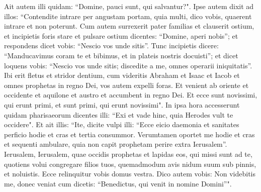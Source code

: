 \begin{biblechapter}
\verse Ait autem illi quidam: “Domine, pauci sunt, qui salvantur?". Ipse autem dixit ad illos: 
\verse “Contendite intrare per angustam portam, quia multi, dico vobis, quaerent intrare et non poterunt. 
\verse Cum autem surrexerit pater familias et clauserit ostium, et incipietis foris stare et pulsare ostium dicentes: “Domine, aperi nobis”; et respondens dicet vobis: “Nescio vos unde sitis”. 
\verse Tunc incipietis dicere: “Manducavimus coram te et bibimus, et in plateis nostris docuisti”; 
\verse et dicet loquens vobis: “Nescio vos unde sitis; discedite a me, omnes operarii iniquitatis”. 
\verse Ibi erit fletus et stridor dentium, cum videritis Abraham et Isaac et Iacob et omnes prophetas in regno Dei, vos autem expelli foras. 
\verse Et venient ab oriente et occidente et aquilone et austro et accumbent in regno Dei. 
\verse Et ecce sunt novissimi, qui erunt primi, et sunt primi, qui erunt novissimi". 
\verse In ipsa hora accesserunt quidam pharisaeorum dicentes illi: “Exi et vade hinc, quia Herodes vult te occidere". 
\verse Et ait illis: “Ite, dicite vulpi illi: “Ecce eicio daemonia et sanitates perficio hodie et cras et tertia consummor. 
\verse Verumtamen oportet me hodie et cras et sequenti ambulare, quia non capit prophetam perire extra Ierusalem”. 
\verse Ierusalem, Ierusalem, quae occidis prophetas et lapidas eos, qui missi sunt ad te, quotiens volui congregare filios tuos, quemadmodum avis nidum suum sub pinnis, et noluistis. 
\verse Ecce relinquitur vobis domus vestra. Dico autem vobis: Non videbitis me, donec veniat cum dicetis: “Benedictus, qui venit in nomine Domini”". 
\end{biblechapter}

